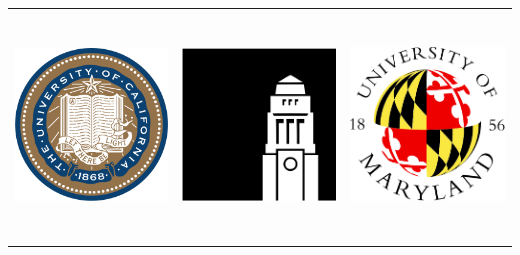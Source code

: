 \documentclass[landscape,a0b,final]{a0poster}
\begin{document}
\vspace*{1cm}


\begin{center}

\hspace*{-9cm}
\begin{minipage}[c][9cm][c]{0.1\textwidth}
  \begin{center}
    \begin{tabular}{ccc}
    \includegraphics[height=6cm,angle=0]{ucseal.pdf} &
    \includegraphics[height=6cm,angle=0]{leeds.png} &
    \includegraphics[height=6cm,angle=0]{maryland.png} 
    \end{tabular}
  \end{center}
\end{minipage}

\end{center}
\end{document}
